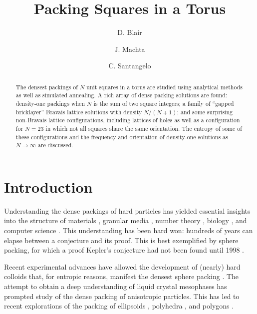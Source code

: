\documentclass[aps]{revtex4}
\begin{document}
\title{Packing Squares in a Torus}

\author{D. Blair}

\author{J. Machta}

\author{C. Santangelo}

\begin{abstract}
The densest packings of $N$ unit squares in a torus are studied using analytical methods as well as simulated annealing.  A rich array of dense packing solutions are found: density-one packings when $N$ is the sum of two square integers; a family of ``gapped bricklayer'' Bravais lattice solutions with density $N/(N+1)$; and some surprising non-Bravais lattice configurations, including lattices of holes as well as a configuration for $N=23$ in which not all squares share the same orientation.  The entropy of some of these configurations and the frequency and orientation of density-one solutions as $N \rightarrow \infty$ are discussed.

\end{abstract} 
\maketitle


\section{Introduction}

Understanding the dense packings of hard particles has yielded essential insights into the structure of materials \cite{Bernal1964,Zallen1983,Torquato2002,Chaikin2000}, granular media \cite{Torquato2002,Mehta1994}, number theory \cite{COHNa,Conway1999}, biology 
\cite{Gevertz2008,Purohit2003}, and computer science \cite{Johnson1974,Lodi2002}. This understanding has been hard won: hundreds of years can elapse between a conjecture and its proof. This is best exemplified by sphere packing, for which a proof Kepler's conjecture had not been found until 1998 \cite{HALESa}.

Recent experimental advances have allowed the development of (nearly) hard colloids that, for entropic reasons, manifest the densest sphere packing \cite{Pusey1986}. The attempt to obtain a deep understanding of liquid crystal mesophases has prompted study of the dense packing of anisotropic particles. This has led to recent explorations of the packing of ellipsoids \cite{Donev2004,Ras2011}, polyhedra \cite{ROAN,BAKER}, and polygons \cite{STROOBANTS}.
\end{document}
